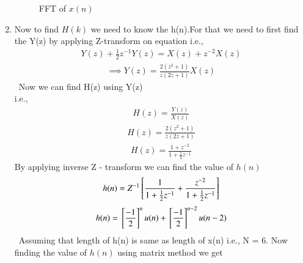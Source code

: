 \documentclass[journal,12pt,twocolumn]{IEEEtran}
\renewcommand\thesection{\arabic{section}}
\begin{document}
\begin{enumerate}[label=\thesection.\arabic*.,ref=\thesection.\theenumi]
\begin{figure}[h!]
    \caption{FFT of $x(n)$}
    \label{yn}
\end{figure}
\item
Now to find $H(k)$ we need to know the h(n).For that we need to first find the Y(z) by applying Z-transform on equation i.e.,
\begin{align}
    Y(z) + \frac{1}{2}z^{-1}Y(z)=X(z) + z^{-2}X(z)
\end{align}
\begin{align}
    \implies Y(z)=\frac{2(z^2+1)}{z(2z+1)}X(z)
\end{align}
\
Now we can find H(z) using Y(z)\\
 i.e.,
\begin{align}
    H(z) = \frac{Y(z)}{X(z)}
\end{align}
\begin{align}
 H(z) = \frac{2(z^2+1)}{z(2z+1)}
\end{align}
\begin{align}
 H(z) = \frac{1+z^{-2}}{1+\frac{1}{2}z^{-1}}
\end{align}
By applying inverse Z - transform we can find the value of $h(n)$
\begin{align}
 h(n)= Z^{-1}{}\left[\frac{1}{1+\frac{1}{2}z^{-1}} + \frac{z^{-2}}{1+\frac{1}{2}z^{-1}}\right]
\end{align}
\begin{align}
 h(n)={}\left[\frac{-1}{2}\right]^nu(n) + {}\left[\frac{-1}{2}\right]^{n-2}u(n-2)
\end{align}
\
 Assuming that length of h(n) is same as length of x(n) i.e., N = 6.
Now finding the value of $h(n)$ using matrix method we get


\end{enumerate}
\end{document}
